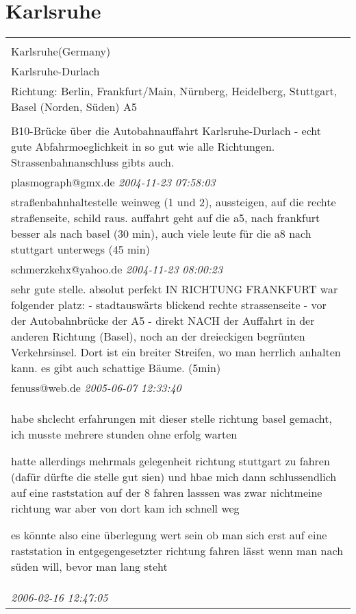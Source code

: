 \documentclass[a4paper,12pt]{article}
\begin{document}
\section{Karlsruhe}
\begin{tabular}{|p{13cm}|}
\hline\\
Karlsruhe(Germany)\\
Karlsruhe-Durlach\\
Richtung: Berlin, Frankfurt/Main, Nürnberg, Heidelberg, Stuttgart, Basel (Norden, Süden) A5 \\
\hline\\
B10-Brücke über die Autobahnauffahrt Karlsruhe-Durlach - echt gute Abfahrmoeglichkeit in so gut wie alle Richtungen. Strassenbahnanschluss gibts auch. \\
plasmograph@gmx.de \textit{ 2004-11-23 07:58:03 }\\\hline straßenbahnhaltestelle weinweg (1 und 2), aussteigen, auf die rechte straßenseite, schild raus. auffahrt geht auf die a5, nach frankfurt besser als nach basel (30 min), auch viele leute für die a8 nach stuttgart unterwegs (45 min) \\
schmerzkehx@yahoo.de \textit{ 2004-11-23 08:00:23 }\\\hline sehr gute stelle.
absolut perfekt IN RICHTUNG FRANKFURT war folgender platz:
- stadtauswärts blickend rechte strassenseite
- vor der Autobahnbrücke der A5
- direkt NACH der Auffahrt in der anderen Richtung (Basel), noch an der dreieckigen begrünten Verkehrsinsel. Dort ist ein breiter Streifen, wo man herrlich anhalten kann. es gibt auch schattige Bäume. (5min) \\
fenuss@web.de \textit{ 2005-06-07 12:33:40 }\\\hline habe shclecht erfahrungen mit dieser stelle richtung basel gemacht, ich musste mehrere stunden ohne erfolg warten

hatte allerdings mehrmals gelegenheit richtung stuttgart zu fahren (dafür dürfte die stelle gut sien) und hbae mich dann schlussendlich auf eine raststation auf der 8 fahren lasssen was zwar nichtmeine richtung war aber von dort kam ich schnell weg

es könnte also eine überlegung wert sein ob man sich erst auf eine raststation in entgegengesetzter richtung fahren lässt wenn man nach süden will, bevor man lang steht \\
\textit{ 2006-02-16 12:47:05 }\\\hline
\end{tabular}
\end{document}
